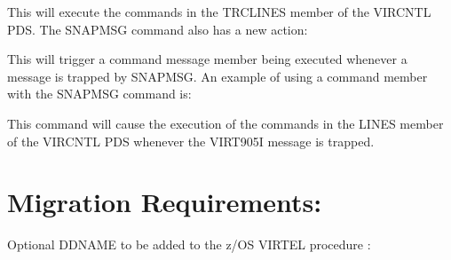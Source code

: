 \documentclass[letterpaper,10pt,english]{sphinxmanual}
\begin{document}
\begin{sphinxVerbatim}[commandchars=\\\{\}]
 
\end{sphinxVerbatim}

\sphinxAtStartPar
This will execute the commands in the TRCLINES member of the VIRCNTL PDS. The SNAPMSG command also has a new action: \sphinxhyphen{}

\begin{sphinxVerbatim}[commandchars=\\\{\}]
\end{sphinxVerbatim}

\sphinxAtStartPar
This will trigger a command message member being executed whenever a message is trapped by SNAPMSG. An example of using a command member with the SNAPMSG command is: \sphinxhyphen{}

\begin{sphinxVerbatim}[commandchars=\\\{\}]
 
\end{sphinxVerbatim}

\sphinxAtStartPar
This command will cause the execution of the commands in the LINES member of the VIRCNTL PDS whenever the VIRT905I message is trapped.


\section{Migration Requirements: \sphinxhyphen{}}
\label{\detokenize{TN202303:migration-requirements}}
\sphinxAtStartPar
Optional DDNAME to be added to the z/OS VIRTEL procedure : \sphinxhyphen{}

\begin{sphinxVerbatim}[commandchars=\\\{\}]
      
             
\end{sphinxVerbatim}
\end{document}
